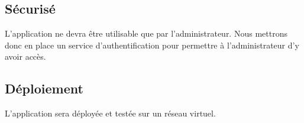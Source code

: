 \subsection{Sécurisé}
L’application ne devra être utilisable que par l'administrateur. Nous mettrons donc en place un service d'authentification pour permettre à l'administrateur d'y avoir accès.

\subsection{Déploiement}
L'application sera déployée et testée sur un réseau virtuel.

